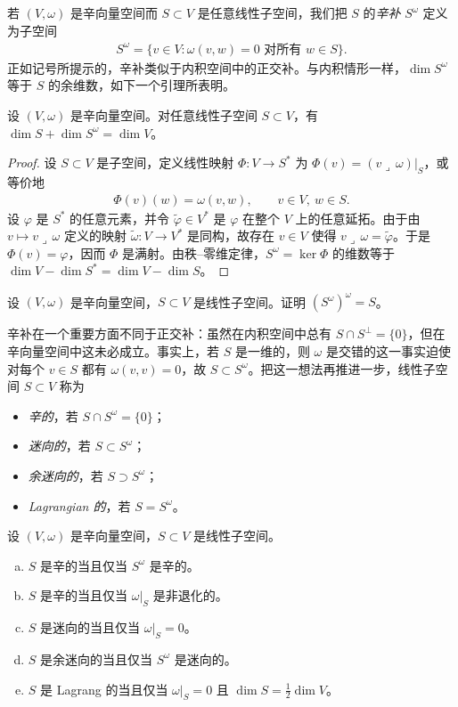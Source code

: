 \documentclass[../../main.tex]{subfiles}
\begin{document}
若 $(V,\omega)$ 是辛向量空间而 $S\subset V$ 是任意线性子空间，我们把 $S$ 的\emph{辛补} $S^\omega$ 定义为子空间
\begin{align*}
S^\omega=\{v\in V:\omega(v,w)=0\text{ 对所有 }w\in S\}.
\end{align*}
正如记号所提示的，辛补类似于内积空间中的正交补。与内积情形一样，$\dim S^\omega$ 等于 $S$ 的余维数，如下一个引理所表明。

\begin{lemma}\label{lemma:ch22-symplectic-complement-dim}
设 $(V,\omega)$ 是辛向量空间。对任意线性子空间 $S\subset V$，有 $\dim S+\dim S^\omega=\dim V$。
\end{lemma}

\begin{proof}
设 $S\subset V$ 是子空间，定义线性映射 $\Phi:V\to S^*$ 为 $\Phi(v)=(v\lrcorner\,\omega)|_S$，或等价地
\begin{align*}
\Phi(v)(w)=\omega(v,w),\qquad v\in V,\ w\in S.
\end{align*}
设 $\varphi$ 是 $S^*$ 的任意元素，并令 $\widetilde\varphi\in V^*$ 是 $\varphi$ 在整个 $V$ 上的任意延拓。由于由 $v\mapsto v\lrcorner\,\omega$ 定义的映射 $\widetilde\omega:V\to V^*$ 是同构，故存在 $v\in V$ 使得 $v\lrcorner\,\omega=\widetilde\varphi$。于是 $\Phi(v)=\varphi$，因而 $\Phi$ 是满射。由秩--零维定律，$S^\omega=\ker\Phi$ 的维数等于 $\dim V-\dim S^*=\dim V-\dim S$。
\end{proof}

\begin{exercise}\label{exercise:ch22-04}
设 $(V,\omega)$ 是辛向量空间，$S\subset V$ 是线性子空间。证明 $(S^\omega)^\omega=S$。
\end{exercise}

辛补在一个重要方面不同于正交补：虽然在内积空间中总有 $S\cap S^\perp=\{0\}$，但在辛向量空间中这未必成立。事实上，若 $S$ 是一维的，则 $\omega$ 是交错的这一事实迫使对每个 $v\in S$ 都有 $\omega(v,v)=0$，故 $S\subset S^\omega$。把这一想法再推进一步，线性子空间 $S\subset V$ 称为
\begin{itemize}
\item \emph{辛的}，若 $S\cap S^\omega=\{0\}$；
\item \emph{迷向的}，若 $S\subset S^\omega$；
\item \emph{余迷向的}，若 $S\supset S^\omega$；
\item \emph{Lagrangian 的}，若 $S=S^\omega$。
\end{itemize}

\begin{proposition}\label{proposition:ch22-subspace-types}
设 $(V,\omega)$ 是辛向量空间，$S\subset V$ 是线性子空间。
\begin{enumerate}[(a)]
\item $S$ 是辛的当且仅当 $S^\omega$ 是辛的。
\item $S$ 是辛的当且仅当 $\omega|_S$ 是非退化的。
\item $S$ 是迷向的当且仅当 $\omega|_S=0$。
\item $S$ 是余迷向的当且仅当 $S^\omega$ 是迷向的。
\item $S$ 是 Lagrang 的当且仅当 $\omega|_S=0$ 且 $\dim S=\tfrac12\dim V$。
\end{enumerate}
\end{proposition}
\end{document}
